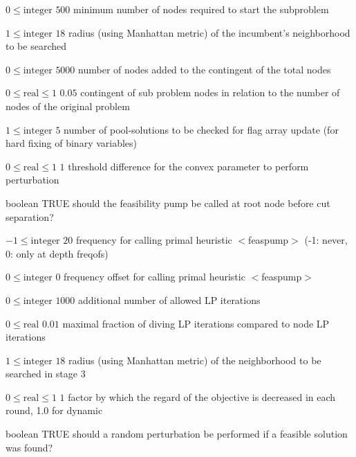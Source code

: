 %
{$0\leq\textrm{integer}$}%
{$500$}%
{minimum number of nodes required to start the subproblem}%
{}

%
{$1\leq\textrm{integer}$}%
{$18$}%
{radius (using Manhattan metric) of the incumbent's neighborhood to be searched}%
{}

%
{$0\leq\textrm{integer}$}%
{$5000$}%
{number of nodes added to the contingent of the total nodes}%
{}

%
{$0\leq\textrm{real}\leq1$}%
{$0.05$}%
{contingent of sub problem nodes in relation to the number of nodes of the original problem}%
{}

%
{$1\leq\textrm{integer}$}%
{$5$}%
{number of pool-solutions to be checked for flag array update (for hard fixing of binary variables)}%
{}

%
{$0\leq\textrm{real}\leq1$}%
{$1$}%
{threshold difference for the convex parameter to perform perturbation}%
{}

%
{boolean}%
{TRUE}%
{should the feasibility pump be called at root node before cut separation?}%
{}

%
{$-1\leq\textrm{integer}$}%
{$20$}%
{frequency for calling primal heuristic $<$feaspump$>$ (-1: never, 0: only at depth freqofs)}%
{}

%
{$0\leq\textrm{integer}$}%
{$0$}%
{frequency offset for calling primal heuristic $<$feaspump$>$}%
{}

%
{$0\leq\textrm{integer}$}%
{$1000$}%
{additional number of allowed LP iterations}%
{}

%
{$0\leq\textrm{real}$}%
{$0.01$}%
{maximal fraction of diving LP iterations compared to node LP iterations}%
{}

%
{$1\leq\textrm{integer}$}%
{$18$}%
{radius (using Manhattan metric) of the neighborhood to be searched in stage 3}%
{}

%
{$0\leq\textrm{real}\leq1$}%
{$1$}%
{factor by which the regard of the objective is decreased in each round, 1.0 for dynamic}%
{}

%
{boolean}%
{TRUE}%
{should a random perturbation be performed if a feasible solution was found?}%
{}

